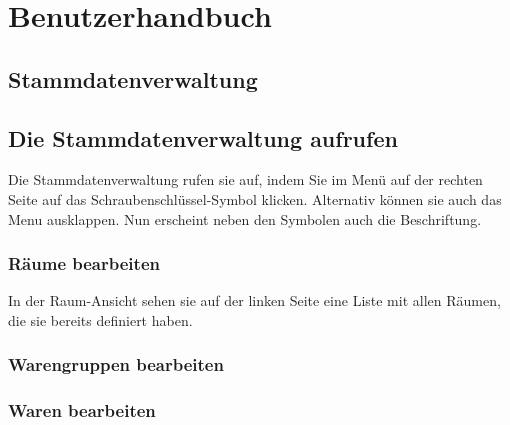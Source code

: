 \section{Benutzerhandbuch}

\subsection{Stammdatenverwaltung}

\subsection{Die Stammdatenverwaltung aufrufen}

Die Stammdatenverwaltung rufen sie auf, indem Sie im Menü auf der rechten Seite auf das Schraubenschlüssel-Symbol klicken. Alternativ können sie auch das Menu ausklappen. Nun erscheint neben den Symbolen auch die Beschriftung.

\subsubsection{Räume bearbeiten}

In der Raum-Ansicht sehen sie auf der linken Seite eine Liste mit allen Räumen, die sie bereits definiert haben.

\subsubsection{Warengruppen bearbeiten}

\subsubsection{Waren bearbeiten}
